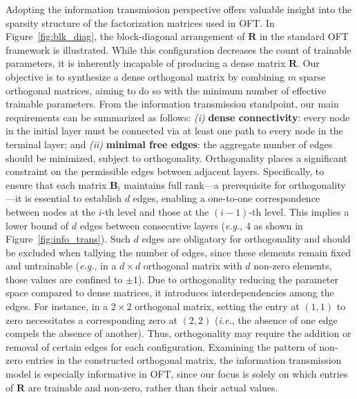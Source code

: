 Adopting the information transmission perspective offers valuable insight into the sparsity structure of the factorization matrices used in OFT. In Figure~\ref{fig:blk_diag}, the block-diagonal arrangement of $\bm{R}$ in the standard OFT framework is illustrated. While this configuration decreases the count of trainable parameters, it is inherently incapable of producing a dense matrix $\bm{R}$. Our objective is to synthesize a dense orthogonal matrix by combining $m$ sparse orthogonal matrices, aiming to do so with the minimum number of effective trainable parameters. From the information transmission standpoint, our main requirements can be summarized as follows: \emph{(i)} \textbf{dense connectivity}: every node in the initial layer must be connected via at least one path to every node in the terminal layer; and \emph{(ii)} \textbf{minimal free edges}: the aggregate number of edges should be minimized, subject to orthogonality. Orthogonality places a significant constraint on the permissible edges between adjacent layers. Specifically, to ensure that each matrix $\bm{B}_i$ maintains full rank—a prerequisite for orthogonality—it is essential to establish $d$ edges, enabling a one-to-one correspondence between nodes at the $i$-th level and those at the $(i-1)$-th level. This implies a lower bound of $d$ edges between consecutive layers (\emph{e.g.}, 4 as shown in Figure~\ref{fig:info_trans}). Such $d$ edges are obligatory for orthogonality and should be excluded when tallying the number of edges, since these elements remain fixed and untrainable (\emph{e.g.}, in a $d\times d$ orthogonal matrix with $d$ non-zero elements, those values are confined to $\pm 1$). Due to orthogonality reducing the parameter space compared to dense matrices, it introduces interdependencies among the edges. For instance, in a $2\times 2$ orthogonal matrix, setting the entry at $(1,1)$ to zero necessitates a corresponding zero at $(2,2)$ (\emph{i.e.}, the absence of one edge compels the absence of another). Thus, orthogonality may require the addition or removal of certain edges for each configuration. Examining the pattern of non-zero entries in the constructed orthogonal matrix, the information transmission model is especially informative in OFT, since our focus is solely on which entries of $\bm{R}$ are trainable and non-zero, rather than their actual values.

